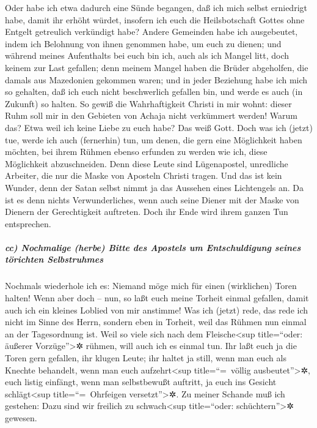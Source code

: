  Oder habe ich etwa dadurch eine Sünde begangen, daß ich
mich selbst erniedrigt habe, damit ihr erhöht würdet, insofern ich euch
die Heilsbotschaft Gottes ohne Entgelt getreulich verkündigt habe?
 Andere Gemeinden habe ich ausgebeutet, indem ich
Belohnung von ihnen genommen habe, um euch zu dienen;  und
während meines Aufenthalts bei euch bin ich, auch als ich Mangel litt,
doch keinem zur Last gefallen; denn meinem Mangel haben die Brüder
abgeholfen, die damals aus Mazedonien gekommen waren; und in jeder
Beziehung habe ich mich so gehalten, daß ich euch nicht beschwerlich
gefallen bin, und werde es auch (in Zukunft) so halten. 
So gewiß die Wahrhaftigkeit Christi in mir wohnt: dieser Ruhm soll mir
in den Gebieten von Achaja nicht verkümmert werden! 
Warum das? Etwa weil ich keine Liebe zu euch habe? Das weiß Gott.
 Doch was ich (jetzt) tue, werde ich auch (fernerhin)
tun, um denen, die gern eine Möglichkeit haben möchten, bei ihrem Rühmen
ebenso erfunden zu werden wie ich, diese Möglichkeit abzuschneiden.
 Denn diese Leute sind Lügenapostel, unredliche Arbeiter,
die nur die Maske von Aposteln Christi tragen.  Und das
ist kein Wunder, denn der Satan selbst nimmt ja das Aussehen eines
Lichtengels an.  Da ist es denn nichts Verwunderliches,
wenn auch seine Diener mit der Maske von Dienern der Gerechtigkeit
auftreten. Doch ihr Ende wird ihrem ganzen Tun entsprechen.

\hypertarget{cc-nochmalige-herbe-bitte-des-apostels-um-entschuldigung-seines-tuxf6richten-selbstruhmes}{%
\subparagraph{cc) Nochmalige (herbe) Bitte des Apostels um
Entschuldigung seines törichten
Selbstruhmes}\label{cc-nochmalige-herbe-bitte-des-apostels-um-entschuldigung-seines-tuxf6richten-selbstruhmes}}

 Nochmals wiederhole ich es: Niemand möge mich für einen
(wirklichen) Toren halten! Wenn aber doch -- nun, so laßt euch meine
Torheit einmal gefallen, damit auch ich ein kleines Loblied von mir
anstimme!  Was ich (jetzt) rede, das rede ich nicht im
Sinne des Herrn, sondern eben in Torheit, weil das Rühmen nun einmal an
der Tagesordnung ist.  Weil so viele sich nach dem
Fleische\textless sup title=``oder: äußerer Vorzüge''\textgreater✲
rühmen, will auch ich es einmal tun.  Ihr laßt euch ja
die Toren gern gefallen, ihr klugen Leute;  ihr haltet ja
still, wenn man euch als Knechte behandelt, wenn man euch
aufzehrt\textless sup title=``=~völlig ausbeutet''\textgreater✲, euch
listig einfängt, wenn man selbstbewußt auftritt, ja euch ins Gesicht
schlägt\textless sup title=``=~Ohrfeigen versetzt''\textgreater✲.
 Zu meiner Schande muß ich gestehen: Dazu sind wir
freilich zu schwach\textless sup title=``oder: schüchtern''\textgreater✲
gewesen.


